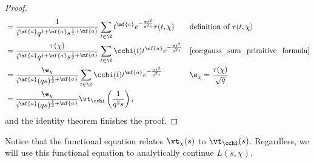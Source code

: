 \begin{proof}
\begin{align*}
          &= \frac{1}{i^{\mf{a}}q^{1+\mf{a}}s^{\frac{1}{2}+\mf{a}}}\sum_{t \in \Z}t^{\mf{a}}e^{-\frac{\pi t^{2}}{q^{2}s}}\tau(t,\chi) && \text{definition of $\tau(t,\chi)$} \\
          &= \frac{\tau(\chi)}{i^{\mf{a}}q^{1+\mf{a}}s^{\frac{1}{2}+\mf{a}}}\sum_{t \in \Z}\cchi(t)t^{\mf{a}}e^{-\frac{\pi t^{2}}{q^{2}s}} && \text{\cref{cor:gauss_sum_primitive_formula}} \\
          &= \frac{\e_{\chi}}{i^{\mf{a}}(qs)^{\frac{1}{2}+\mf{a}}}\sum_{t \in \Z}\cchi(t)t^{\mf{a}}e^{-\frac{\pi t^{2}}{q^{2}s}} && \text{$\e_{\chi} = \frac{\tau(\chi)}{\sqrt{q}}$} \\
          &=  \frac{\e_{\chi}}{i^{\mf{a}}(qs)^{\frac{1}{2}+\mf{a}}}\vt_{\cchi}\left(\frac{1}{q^{2}s}\right),
        \end{align*}
        and the identity theorem finishes the proof.
      \end{proof}
      Notice that the functional equation relates $\vt_{\chi}(s)$ to $\vt_{\cchi}(s)$. Regardless, we will use this functional equation to analytically continue $L(s,\chi)$.
